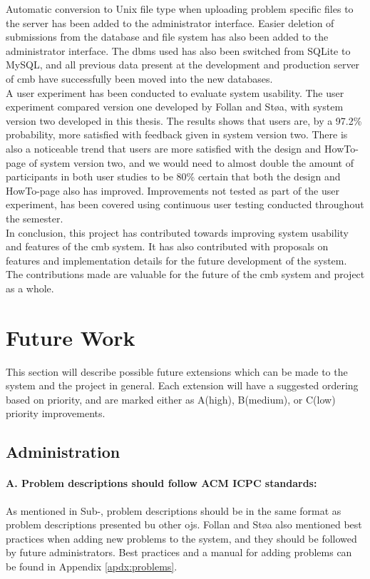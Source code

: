 Automatic conversion to Unix file type when uploading problem specific files to the server has been added to the administrator interface. Easier deletion of submissions from the database and file system has also been added to the administrator interface. The \gls{dbms} used has also been switched from SQLite to MySQL, and all previous data present at the development and production server of \gls{cmb} have successfully been moved into the new databases. \\

A user experiment has been conducted to evaluate system usability. The user experiment compared version one developed by Follan and Støa, with system version two developed in this thesis. The results shows that users are, by a 97.2\% probability, more satisfied with feedback given in system version two. There is also a noticeable trend that users are more satisfied with the design and HowTo-page of system version two, and we would need to almost double the amount of participants in both user studies to be 80\% certain that both the design and HowTo-page also has improved. Improvements not tested as part of the user experiment, has been covered using continuous user testing conducted throughout the semester. \\

In conclusion, this project has contributed towards improving system usability and features of the \gls{cmb} system. It has also contributed with proposals on features and implementation details for the future development of the system. The contributions made are valuable for the future of the \gls{cmb} system and project as a whole.


\section{Future Work}
\label{sec:future-work}
This section will describe possible future extensions which can be made to the system and the project in general. Each extension will have a suggested ordering based on priority, and are marked either as A(high), B(medium), or C(low) priority improvements.

\subsection*{Administration}

\paragraph*{A. Problem descriptions should follow ACM ICPC standards:} As mentioned in Sub-, problem descriptions should be in the same format as problem descriptions presented bu other \glspl{oj}. Follan and Støa also mentioned best practices when adding new problems to the system, and they should be followed by future administrators. Best practices and a manual for adding problems can be found in Appendix \ref{apdx:problems}.

